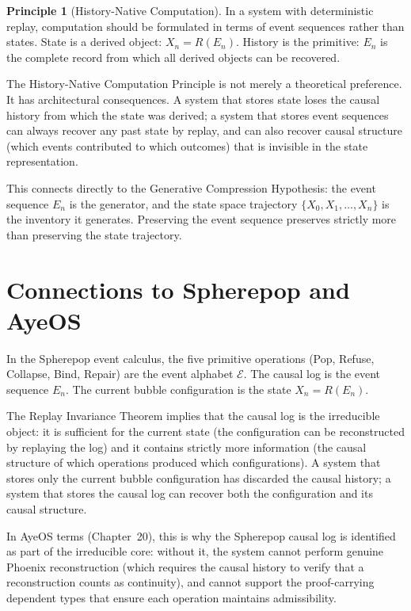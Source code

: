 \documentclass[12pt, oneside]{book}
\theoremstyle{flyxion}
\theoremstyle{definition}
\newtheorem{principle}[theorem]{Principle}
\begin{document}
\begin{principle}[History-Native Computation]
\label{prin:history_native}
In a system with deterministic replay, computation should
be formulated in terms of event sequences rather than
states. State is a derived object: $X_n = R(E_n)$.
History is the primitive: $E_n$ is the complete record
from which all derived objects can be recovered.
\end{principle}

The History-Native Computation Principle is not merely a
theoretical preference. It has architectural consequences.
A system that stores state loses the causal history from
which the state was derived; a system that stores event
sequences can always recover any past state by replay,
and can also recover causal structure (which events
contributed to which outcomes) that is invisible in the
state representation.

This connects directly to the Generative Compression
Hypothesis: the event sequence $E_n$ is the generator,
and the state space trajectory $\{X_0, X_1, \ldots, X_n\}$
is the inventory it generates. Preserving the event
sequence preserves strictly more than preserving the
state trajectory.

\section{Connections to Spherepop and AyeOS}

In the Spherepop event calculus, the five primitive
operations (Pop, Refuse, Collapse, Bind, Repair) are
the event alphabet $\mathcal{E}$. The causal log is the
event sequence $E_n$. The current bubble configuration
is the state $X_n = R(E_n)$.

The Replay Invariance Theorem implies that the causal
log is the irreducible object: it is sufficient for the
current state (the configuration can be reconstructed
by replaying the log) and it contains strictly more
information (the causal structure of which operations
produced which configurations). A system that stores
only the current bubble configuration has discarded the
causal history; a system that stores the causal log can
recover both the configuration and its causal structure.

In AyeOS terms (Chapter~20), this is why the Spherepop
causal log is identified as part of the irreducible core:
without it, the system cannot perform genuine Phoenix
reconstruction (which requires the causal history to
verify that a reconstruction counts as continuity), and
cannot support the proof-carrying dependent types that
ensure each operation maintains admissibility.
\end{document}
